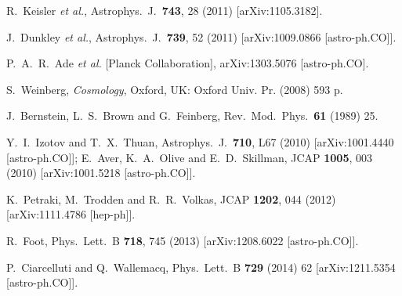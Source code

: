\documentclass[12pt]{article}
\begin{document}
{{\begin{thebibliography}{999}
   R.~Keisler {\it et al.},
Astrophys.\ J.\  {\bf 743}, 28 (2011) [arXiv:1105.3182].
  
  J.~Dunkley {\it et al.},
  Astrophys.\ J.\  {\bf 739}, 52 (2011)
  [arXiv:1009.0866 [astro-ph.CO]].
 
  P.~A.~R.~Ade {\it et al.}  [Planck Collaboration],
  arXiv:1303.5076 [astro-ph.CO].
  
  S.~Weinberg,
  {\it Cosmology},
  Oxford, UK: Oxford Univ. Pr. (2008) 593 p.
  
  J.~Bernstein, L.~S.~Brown and G.~Feinberg,
  Rev.\ Mod.\ Phys.\  {\bf 61} (1989) 25.
  
  Y.~I.~Izotov and T.~X.~Thuan,
  Astrophys.\ J.\  {\bf 710}, L67 (2010)
  [arXiv:1001.4440 [astro-ph.CO]];
  E.~Aver, K.~A.~Olive and E.~D.~Skillman,
  JCAP {\bf 1005}, 003 (2010)
  [arXiv:1001.5218 [astro-ph.CO]].
  
  K.~Petraki, M.~Trodden and R.~R.~Volkas,
  JCAP {\bf 1202}, 044 (2012)
  [arXiv:1111.4786 [hep-ph]].
  
  R.~Foot,
  Phys.\ Lett.\ B {\bf 718}, 745 (2013)
  [arXiv:1208.6022 [astro-ph.CO]].
 
  P.~Ciarcelluti and Q.~Wallemacq,
  Phys.\ Lett.\ B {\bf 729} (2014) 62
  [arXiv:1211.5354 [astro-ph.CO]].
  

\end{thebibliography}}}
\end{document}

